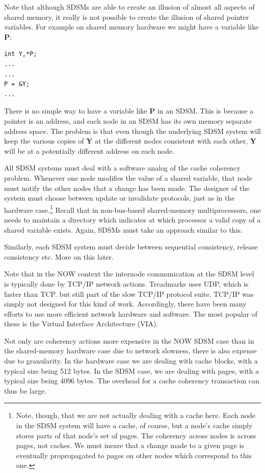 Note that although SDSMs are able to create an illusion of almost all
aspects of shared memory, it really is not possible to create the
illusion of shared pointer variables.  For example on shared memory
hardware we might have a variable like {\bf P}:

\begin{Verbatim}[fontsize=\relsize{-2}]
int Y,*P;
...
...
P = &Y;
...
\end{Verbatim}

There is no simple way to have a variable like {\bf P} in an SDSM.
This is because a pointer is an address, and each node in an SDSM
has its own memory separate address space.  The problem is that even
though the underlying SDSM system will keep the various copies of {\bf Y}
at the different nodes consistent with each other, {\bf Y} will be at a
potentially different address on each node.

All SDSM systems must deal with a software analog of the cache coherency
problem.  Whenever one node modifies the value of a shared variable,
that node must notify the other nodes that a change has been made.  The
designer of the system must choose between update or invalidate
protocols, just as in the hardware case.\footnote{Note, though, that we
are not actually dealing with a cache here.  Each node in the SDSM
system will have a cache, of course, but a node's cache simply stores
parts of that node's set of pages.  The coherency across nodes is across
pages, not caches.  We must insure that a change made to a given page is
eventually propropagated to pages on other nodes which correspond to
this one.} Recall that in non-bus-based shared-memory multiprocessors,
one needs to maintain a directory which indicates at which processor a
valid copy of a shared variable exists.  Again, SDSMs must take an
approach similar to this.

Similarly, each SDSM system must decide between sequential
consistency, release consistency etc.  More on this later.

Note that in the NOW context the internode communication at the SDSM
level is typically done by TCP/IP network actions.  Treadmarks uses UDP,
which is faster than TCP. but still part of the slow TCP/IP protocol
suite.  TCP/IP was simply not designed for this kind of work.
Accordingly, there have been many efforts to use more efficient network
hardware and software.  The most popular of these is the Virtual
Interface Architecture (VIA).

Not only are coherency actions more expensive in the NOW SDSM case than in
the shared-memory hardware case due to network slowness, there is also
expense due to granularity.  In the hardware case we are dealing with
cache blocks, with a typical size being 512 bytes.  In the SDSM case, we
are dealing with pages, with a typical size being 4096 bytes.  The
overhead for a cache coherency transaction can thus be large.

